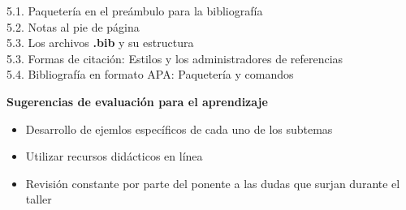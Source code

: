 \documentclass[12pt]{article}
\begin{document}
\begin{enumerate}
5.1. Paquetería en el preámbulo para la bibliografía\\
5.2. Notas al pie de página\\
5.3. Los archivos \textbf{.bib} y su estructura\\
5.3. Formas de citación: Estilos y los administradores de referencias\\
5.4. Bibliografía en formato APA: Paquetería y comandos
\end{enumerate}
\textbf{Sugerencias de evaluación para el aprendizaje}
\begin{itemize}
 \item Desarrollo de ejemlos específicos de cada uno de los subtemas
 \item Utilizar recursos didácticos en línea
 \item Revisión constante por parte del ponente a las dudas que surjan durante el taller

\end{itemize}

\nocite{*}

\end{document}
